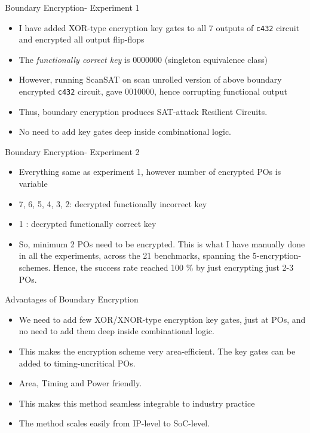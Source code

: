 \begin{frame}{Boundary Encryption- Experiment 1}
\begin{itemize}
\item I have added XOR-type encryption key gates to all 7 outputs of \texttt{c432} circuit and encrypted all output flip-flops
\item The {\em functionally correct key} is \alert{0000000} (singleton equivalence class)
\item However, running ScanSAT on scan unrolled version of above boundary encrypted \texttt{c432} circuit, gave \alert{0010000}, hence corrupting functional output
\item Thus, boundary encryption produces SAT-attack Resilient Circuits. 
\item No need to add key gates deep inside combinational logic. 
\end{itemize}
\end{frame}


\begin{frame}{Boundary Encryption- Experiment 2}
\begin{itemize}
\item Everything same as experiment 1, however number of encrypted POs is variable
\item {7, 6, 5, 4, 3, 2}: decrypted \alert{functionally incorrect key}
\item {1} : decrypted {functionally correct key}
\item So, minimum 2 POs need to be encrypted. This is what I have manually done in all the experiments, across the 21 benchmarks, spanning the 5-encryption-schemes. Hence, the success rate reached \alert{100 \%} by just encrypting just 2-3 POs. 
\end{itemize}
\end{frame}

\begin{frame}{Advantages of Boundary Encryption}
\begin{itemize}
\item We need to add few XOR/XNOR-type encryption key gates, just at POs, and no need to add them deep inside combinational logic. 
\item This makes the encryption scheme very area-efficient. The key gates can be added to timing-uncritical POs. 
\item Area, Timing and Power friendly. 
\item This makes this method seamless integrable to industry practice
\item The method scales easily from IP-level to SoC-level. 
\end{itemize}
\end{frame}

